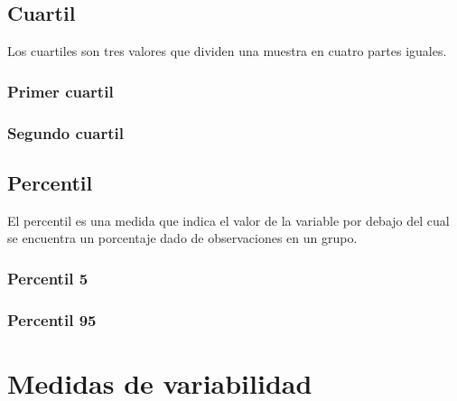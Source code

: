 \documentclass{report}
\begin{document}
        \subsection*{Cuartil}
          Los cuartiles son tres valores que dividen una muestra en cuatro partes
          iguales.
          
          \subsubsection*{Primer cuartil}

          \subsubsection*{Segundo cuartil}

        \subsection*{Percentil}
          El percentil es una medida que indica el valor de la variable por debajo 
          del cual se encuentra un porcentaje dado de observaciones en un grupo.

          \subsubsection*{Percentil 5}

          \subsubsection*{Percentil 95}

    \section*{Medidas de variabilidad}
\end{document}
